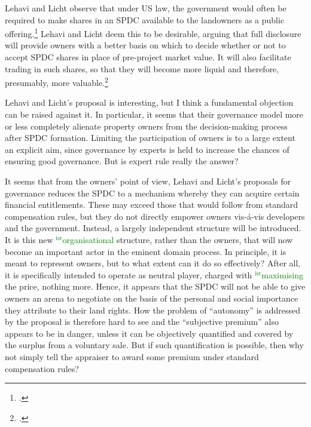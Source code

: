 \documentclass[12pt,a4paper]{book} %
\newcommand{\isr}[1]{\textcolor{green}{$^{\textrm{isr}}${#1}}}
\begin{document}
Lehavi and Licht observe that under US law, the government would often be required to make shares in an SPDC available to the landowners as a public offering.\footcite[1745]{lehavi07} Lehavi and Licht deem this to be desirable, arguing that full disclosure will provide owners with a better basis on which to decide whether or not to accept SPDC shares in place of pre-project market value. It will also facilitate trading in such shares, so that they will become more liquid and therefore, presumably, more valuable.\footcite[1746]{lehavi07} 

Lehavi and Licht's proposal is interesting, but I think a fundamental objection can be raised against it. In particular, it seems that their governance model more or less completely alienate property owners from the decision-making process after SPDC formation. Limiting the participation of owners is to a large extent an explicit aim, since governance by experts is held to increase the chances of ensuring good governance. But is expert rule really the answer?

It seems that from the owners' point of view, Lehavi and Licht's proposals for governance reduces the SPDC to a mechanism whereby they can acquire certain financial entitlements. These may exceed those that would follow from standard compensation rules, but they do not directly empower owners vis-{\'a}-vis developers and the government. Instead, a largely independent structure will be introduced. It is this new \isr{organisational} structure, rather than the owners, that will now become an important actor in the eminent domain process. In principle, it is meant to represent owners, but to what extent can it do so effectively? After all, it is specifically intended to operate as neutral player, charged with \isr{maximising} the price, nothing more. Hence, it appears that the SPDC will not be able to give owners an arena to negotiate on the basis of the personal and social importance they attribute to their land rights. How the problem of ``autonomy'' is addressed by the proposal is therefore hard to see and the ``subjective premium'' also appears to be in danger, unless it can be objectively quantified and covered by the surplus from a voluntary sale. But if such quantification is possible, then why not simply tell the appraiser to award some premium under standard compensation rules?
\end{document}
